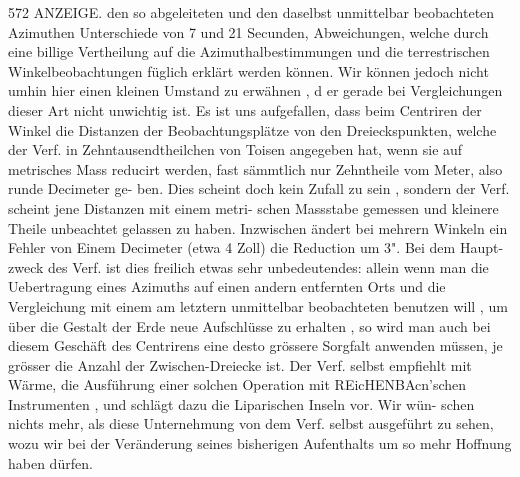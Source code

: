 \documentclass[12pt,a4paper]{article}
\begin{document}
\newpage
572 ANZEIGE.\newline
den so abgeleiteten und den daselbst unmittelbar beobachteten Azimuthen Unterschiede von 7 und 21\newline
Secunden, Abweichungen, welche durch eine billige Vertheilung auf die Azimuthalbestimmungen und die\newline
terrestrischen Winkelbeobachtungen füglich erklärt werden können. Wir können jedoch nicht umhin\newline
hier einen kleinen Umstand zu erwähnen , d er gerade bei Vergleichungen dieser Art nicht unwichtig ist.\newline
Es ist uns aufgefallen, dass beim Centriren der Winkel die Distanzen der Beobachtungsplätze von den\newline
Dreieckspunkten, welche der Verf. in Zehntausendtheilchen von Toisen angegeben hat, wenn sie auf\newline
metrisches Mass reducirt werden, fast sämmtlich nur Zehntheile vom Meter, also runde Decimeter ge-\newline
ben. Dies scheint doch kein Zufall zu sein , sondern der Verf. scheint jene Distanzen mit einem metri-\newline
schen Massstabe gemessen und kleinere Theile unbeachtet gelassen zu haben. Inzwischen ändert bei\newline
mehrern Winkeln ein Fehler von Einem Decimeter (etwa 4 Zoll) die Reduction um 3". Bei dem Haupt-\newline
zweck des Verf. ist dies freilich etwas sehr unbedeutendes: allein wenn man die Uebertragung eines\newline
Azimuths auf einen andern entfernten Orts und die Vergleichung mit einem am letztern unmittelbar\newline
beobachteten benutzen will , um über die Gestalt der Erde neue Aufschlüsse zu erhalten , so wird man\newline
auch bei diesem Geschäft des Centrirens eine desto grössere Sorgfalt anwenden müssen, je grösser die\newline
Anzahl der Zwischen-Dreiecke ist. Der Verf. selbst empfiehlt mit Wärme, die Ausführung einer solchen\newline
Operation mit REicHENBAcn'schen Instrumenten , und schlägt dazu die Liparischen Inseln vor. Wir wün-\newline
schen nichts mehr, als diese Unternehmung von dem Verf. selbst ausgeführt zu sehen, wozu wir bei\newline
der Veränderung seines bisherigen Aufenthalts um so mehr Hoffnung haben dürfen.\newline
\end{document}
